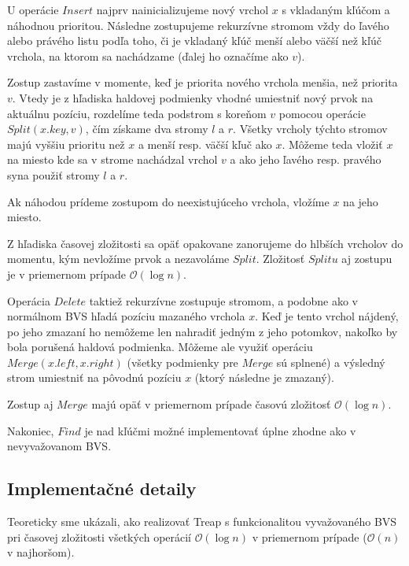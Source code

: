 \documentclass[a4paper, 12pt]{article}
\theoremstyle{definition}
\begin{document}
\bigskip

U operácie $Insert$ najprv nainicializujeme nový vrchol $x$ s vkladaným kľúčom a
náhodnou prioritou. Následne zostupujeme rekurzívne stromom vždy do ľavého
alebo právého listu podľa toho, či je vkladaný kľúč menší alebo väčší než kľúč
vrchola, na ktorom sa nachádzame (ďalej ho označíme ako $v$).

Zostup zastavíme v momente, keď je priorita nového vrchola menšia, než priorita
$v$. Vtedy je z hľadiska haldovej podmienky vhodné umiestniť nový prvok na
aktuálnu pozíciu, rozdelíme teda podstrom s koreňom $v$ pomocou operácie
$Split(x.key, v)$, čím získame dva stromy $l$ a $r$. Všetky vrcholy týchto
stromov majú vyššiu prioritu než $x$ a menší resp. väčší kľuč ako $x$. Môžeme
teda vložiť $x$ na miesto kde sa v strome nachádzal vrchol $v$ a ako jeho
ľavého resp. pravého syna použiť stromy $l$ a $r$.

Ak náhodou prídeme zostupom do neexistujúceho vrchola, vložíme $x$ na jeho
miesto.

Z hľadiska časovej zložitosti sa opäť opakovane zanorujeme do hlbších vrcholov
do momentu, kým nevložíme prvok a nezavoláme $Split$. Zložitosť $Splitu$ aj
zostupu je v priemernom prípade $\mathcal{O}(\log n)$.

\bigskip

Operácia $Delete$ taktiež rekurzívne zostupuje stromom, a podobne ako v
normálnom BVS hľadá pozíciu mazaného vrchola $x$. Keď je tento vrchol nájdený, po
jeho zmazaní ho nemôžeme len nahradiť jedným z jeho potomkov, nakoľko by bola
porušená haldová podmienka. Môžeme ale využiť operáciu
$Merge(x.left, x.right)$ (všetky podmienky pre $Merge$ sú splnené) a výsledný
strom umiestniť na pôvodnú pozíciu $x$ (ktorý následne je zmazaný).

Zostup aj $Merge$ majú opäť v priemernom prípade časovú zložitosť
$\mathcal{O}(\log n)$.

\bigskip

Nakoniec, $Find$ je nad kľúčmi možné implementovať úplne zhodne ako v
nevyvažovanom BVS.

\subsection{Implementačné detaily}

Teoreticky sme ukázali, ako realizovať Treap s funkcionalitou vyvažovaného BVS
pri časovej zložitosti všetkých operácií $\mathcal{O}(\log n)$ v priemernom
prípade ($\mathcal{O}(n)$ v najhoršom).
\end{document}
